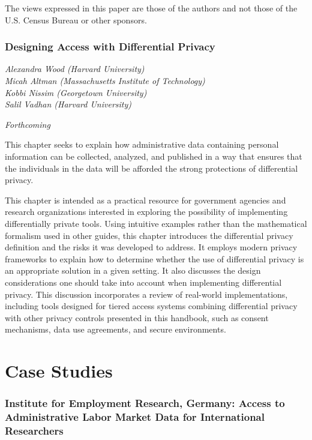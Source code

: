 \documentclass[
]{WileySix}
\begin{document}
The views expressed in this paper are those of the authors and not those of the U.S. Census Bureau or other sponsors.

\hypertarget{diffpriv}{%
\section{Designing Access with Differential Privacy}\label{diffpriv}}

\emph{Alexandra Wood (Harvard University)}\\
\emph{Micah Altman (Massachusetts Institute of Technology)}\\
\emph{Kobbi Nissim (Georgetown University)}\\
\emph{Salil Vadhan (Harvard University)}

\emph{Forthcoming}

This chapter seeks to explain how administrative data containing personal information can be collected, analyzed, and published in a way that ensures that the individuals in the data will be afforded the strong protections of differential privacy.

This chapter is intended as a practical resource for government agencies and research organizations interested in exploring the possibility of implementing differentially private tools. Using intuitive examples rather than the mathematical formalism used in other guides, this chapter introduces the differential privacy definition and the risks it was developed to address. It employs modern privacy frameworks to explain how to determine whether the use of differential privacy is an appropriate solution in a given setting. It also discusses the design considerations one should take into account when implementing differential privacy. This discussion incorporates a review of real-world implementations, including tools designed for tiered access systems combining differential privacy with other privacy controls presented in this handbook, such as consent mechanisms, data use agreements, and secure environments.

\hypertarget{part-case-studies}{%
\part{Case Studies}\label{part-case-studies}}

\hypertarget{iab}{%
\section{Institute for Employment Research, Germany: Access to Administrative Labor Market Data for International Researchers}\label{iab}}
\end{document}
